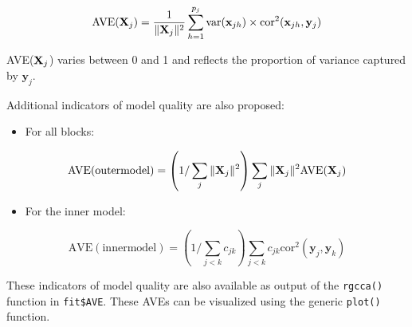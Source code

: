 \documentclass[
]{jss}
\providecommand{\tightlist}{%
  \setlength{\itemsep}{0pt}\setlength{\parskip}{0pt}}
\begin{document}
\begin{equation}
\mathrm{AVE}(\mathbf{X}_j)=  \frac{1}{\Vert \mathbf{X}_j \Vert^2} \sum_{h=1}^{p_j} \text{var}(\mathbf{x}_{jh}) \times \text{cor}^2(\mathbf{x}_{jh},\mathbf{y}_j)
\end{equation}

AVE(\(\mathbf{X}_j\)) varies between 0 and 1 and reflects the proportion of
variance captured by \(\mathbf{y}_j\).

Additional indicators of model quality are also proposed:

\begin{itemize}
\tightlist
\item
  For all blocks:
\end{itemize}

\begin{equation}
\displaystyle \mathrm{AVE(outer model)} = \left( 1/\sum_j \Vert \mathbf{X}_j \Vert^2 \right) \sum_j \Vert \mathbf{X}_j \Vert^2 \mathrm{AVE}(\mathbf{X}_j)
\end{equation}

\begin{itemize}
\tightlist
\item
  For the inner model:
\end{itemize}

\begin{equation}
\displaystyle \mathrm{AVE(inner model)} = \left( 1/\sum_{j<k} c_{jk} \right) \sum_{j<k} c_{jk} \mathrm{cor}^2(\mathbf{y}_j , \mathbf{y}_k)
\end{equation}

These indicators of model quality are also available as output of the
\texttt{rgcca()} function in \texttt{fit\$AVE}. These AVEs can be
visualized using the generic \texttt{plot()} function.

\footnotesize
\end{document}
